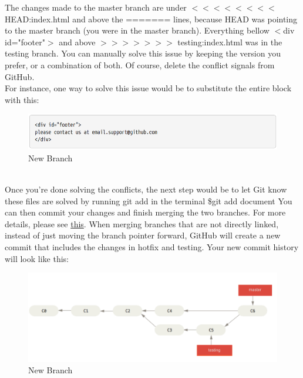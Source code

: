 \documentclass[12pt]{article}
\begin{document}
    \vspace{0.2 in}
    The changes made to the master branch are under $<<<<<<<<$ HEAD:index.html and above the ======= lines, because HEAD was pointing to the master branch (you were in the master branch). Everything bellow $<$div id="footer"$>$ and above  $>>>>>>>$ testing:index.html was in the testing branch. You can manually solve this issue by keeping the version you prefer, or a combination of both. Of course, delete the conflict signals from GitHub. \\
    \indent For instance, one way to solve this issue would be to substitute the entire block with this: \\
    \begin{figure}[h]
	\caption{New Branch}
	\includegraphics[scale=0.5]{figure11}
	\centering
    \end{figure} \\
    Once you're done solving the conflicts, the next step would be to let Git know these files are solved by running git add in the terminal
    \newline
    \newline
    \indent\indent \$git add document
    \newline
    \newline
    You can then commit your changes and finish merging the two branches.
    For more details, please see \href{https://git-scm.com/book/en/v2/Git-Branching-Basic-Branching-and-Merging}{this}.
    When merging branches that are not directly linked, instead of just moving the branch pointer forward, GitHub will create a new commit that includes the changes in hotfix and testing. Your new commit history will look like this: \\
    \begin{figure}[h]
	\caption{New Branch}
	\includegraphics[scale=0.5]{figure12}
	\centering
    \end{figure} 
\end{document}
